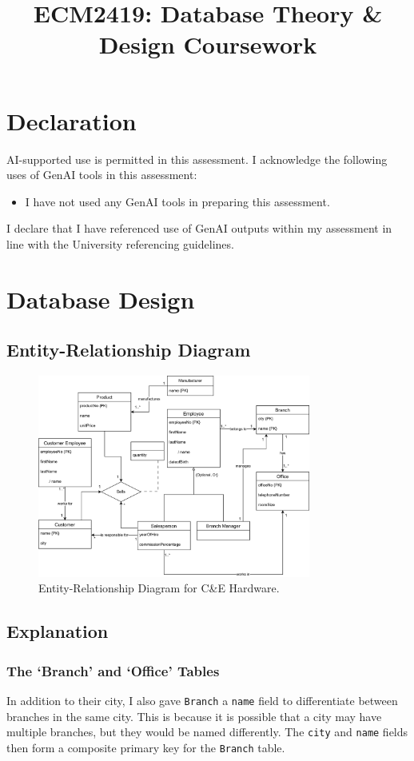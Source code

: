 \documentclass{article}
\title{ECM2419: Database Theory \& Design Coursework}
\author{}
\date{}
\begin{document}
\maketitle
\tableofcontents

\section*{Declaration}
AI-supported use is permitted in this assessment. I acknowledge the following uses of GenAI tools in this assessment:
\begin{itemize}
    \item I have not used any GenAI tools in preparing this assessment.
\end{itemize}
I declare that I have referenced use of GenAI outputs within my assessment in line with the University referencing guidelines.

\section{Database Design}
\subsection{Entity-Relationship Diagram}
\begin{figure}[H]
    \centering
    \includegraphics[width=0.8\textwidth]{ER Diagram.png}
    \caption{Entity-Relationship Diagram for C\&E Hardware.}
\end{figure}

\subsection{Explanation}
\subsubsection{The `Branch' and `Office' Tables}
In addition to their city, I also gave \texttt{Branch} a \texttt{name} field to differentiate between branches in the same city. This is because it is possible that a city may have multiple branches, but they would be named differently. The \texttt{city} and \texttt{name} fields then form a composite primary key for the \texttt{Branch} table.
\end{document}
